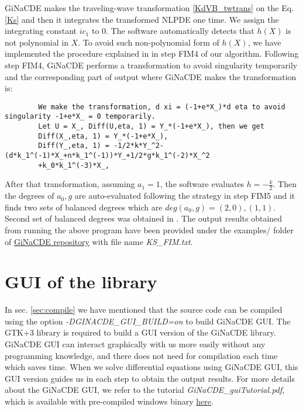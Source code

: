 \documentclass[prd,aps,floats,showkeys,nofootinbib,notitlepage]{revtex4-2}
\begin{document}
	GiNaCDE makes the traveling-wave transformation \eqref{KdVB_twtrans} 
	on the Eq. \eqref{Ks} and then it integrates the transformed NLPDE one time. We assign the integrating constant $ic_1$ to $0$. The software automatically detects that $h(X)$ is not polynomial in $X$. To avoid such non-polynomial form of $h(X)$, we have implemented the procedure explained in \cite{mirza} in step FIM4 of our algorithm. Following step FIM4, GiNaCDE performs a transformation to avoid singularity temporarily and the corresponding part of output where GiNaCDE makes the transformation is:
	\begin{verbatim}
		We make the transformation, d xi = (-1+e*X_)*d eta to avoid singularity -1+e*X_ = 0 temporarily.
		Let U = X_, Diff(U,eta, 1) = Y_*(-1+e*X_), then we get
		Diff(X_,eta, 1) = Y_*(-1+e*X_),
		Diff(Y_,eta, 1) = -1/2*k*Y_^2-(d*k_1^(-1)*X_+n*k_1^(-1))*Y_+1/2*g*k_1^(-2)*X_^2
		+k_0*k_1^(-3)*X_,
	\end{verbatim}
	After that transformation, assuming $a_1=1$, the software evaluates $h=-\frac{k}{2}$. Then the degrees of $a_0,g$ are auto-evaluated following the strategy in step FIM5 and it finds two sets of balanced degrees which are $deg(a_0,g)=(2,0),(1,1)$. Second set of balanced degrees was obtained in \cite{mirza}.  
	The output results obtained from running the above program have been provided under the examples/ folder of \href{https://github.com/mithun218/GiNaCDE}{GiNaCDE repository} with file name \textit{KS\_FIM.txt}.
		
	
	
	\section{GUI of the library}\label{gui}
	In sec. \ref{sec:compile} we have mentioned that the source code can be compiled using the option {\em -DGINACDE\_GUI\_BUILD=on} to build GiNaCDE GUI. The GTK+3 library is required to build a GUI version of the GiNaCDE library. GiNaCDE GUI can interact graphically with us more easily without any programming knowledge, and there does not need for compilation each time which saves time. When we solve differential equations using GiNaCDE GUI, this GUI version guides us in each step to obtain the output results. For more details about the GiNaCDE GUI, we refer to the tutorial \textit{GiNaCDE\_guiTutorial.pdf}, which is available with pre-compiled windows binary \href{https://sourceforge.net/projects/ginacde}{here}.
	
\end{document}
